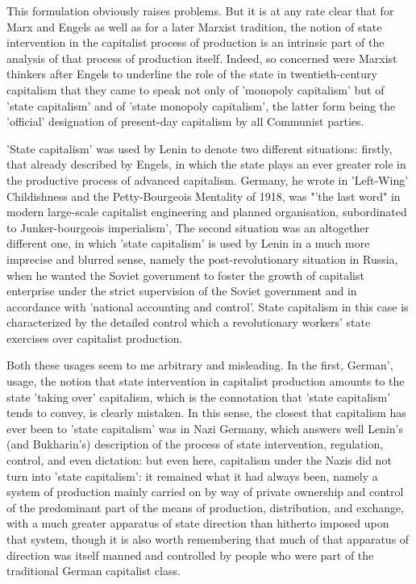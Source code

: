 This formulation obviously raises problems. But it is at any rate clear that for Marx and Engels as well as for a later Marxist tradition, the notion of state intervention in the capitalist process of production is an intrinsic part of the analysis of that process of production itself. Indeed, so concerned were Marxist thinkers after Engels to underline the role of the state in twentieth-century capitalism that they came to speak not only of 'monopoly capitalism' but of 'state capitalism' and of 'state monopoly capitalism', the latter form being the 'official' designation of present-day capitalism by all Communist parties.

'State capitalism' was used by Lenin to denote two different  situations: firstly, that already described by Engels, in which the state plays an ever greater role in the productive process of advanced capitalism. Germany, he wrote in 'Left-Wing' Childishness and the Petty-Bourgeois Mentality of 1918, was "'the last word" in modern large-scale capitalist engineering and planned organisation, subordinated to Junker-bourgeois imperialism', The second situation was an altogether different one, in which 'state capitalism' is used by Lenin in a much more imprecise and blurred sense, namely the post-revolutionary situation in Russia, when he wanted the Soviet government to foster the growth of capitalist enterprise under the strict supervision of the Soviet government and in accordance with 'national accounting and control'. State capitalism in this case is characterized by the detailed control which a revolutionary workers' state exercises over capitalist production.

Both these usages seem to me arbitrary and misleading. In the first, German', usage, the notion that state intervention in capitalist production amounts to the state 'taking over' capitalism, which is the connotation that 'state capitalism' tends to convey, is clearly mistaken. In this sense, the closest that capitalism has ever been to 'state capitalism' was in Nazi Germany, which answers well Lenin's (and Bukharin's) description of the process of state intervention, regulation, control, and even dictation: but even here, capitalism under the Nazis did not turn into 'state capitalism': it remained what it had always been, namely a system of production mainly carried on by way of private ownership and control of the predominant part of the means of production, distribution, and exchange, with a much greater apparatus of state direction than hitherto imposed upon that system, though it is also worth remembering that much of that apparatus of direction was itself manned and controlled by people who were part of the traditional German capitalist class.

